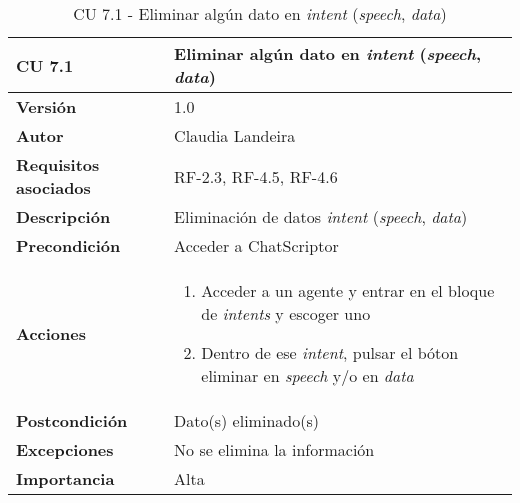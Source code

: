 \begin{table}[p]
	\centering
	\begin{tabularx}{\linewidth}{ p{} p{} }
		\toprule
		\textbf{CU 7.1}    & \textbf{Eliminar algún dato en \textit{intent} (\textit{speech}, \textit{data})}\\
		\toprule
		\textbf{Versión}              & 1.0    \\
		\textbf{Autor}                & Claudia Landeira \\
		\textbf{Requisitos asociados} & RF-2.3, RF-4.5, RF-4.6\\
		\textbf{Descripción}          & Eliminación de datos \textit{intent} (\textit{speech}, \textit{data})\\
		\textbf{Precondición}         & Acceder a ChatScriptor\\
		\textbf{Acciones}             &
		\begin{enumerate}
			\def\labelenumi{\arabic{enumi}.}
			\tightlist
                \item Acceder a un agente y entrar en el bloque de \textit{intents} y escoger uno
                \item Dentro de ese \textit{intent}, pulsar el bóton eliminar en \textit{speech} y/o en \textit{data}
		\end{enumerate}\\
		\textbf{Postcondición}        & Dato(s) eliminado(s)  \\
		\textbf{Excepciones}          & No se elimina la información \\
		\textbf{Importancia}          & Alta \\
		\bottomrule
	\end{tabularx}
	\caption{CU 7.1 - Eliminar algún dato en \textit{intent} (\textit{speech}, \textit{data})}
\end{table}

